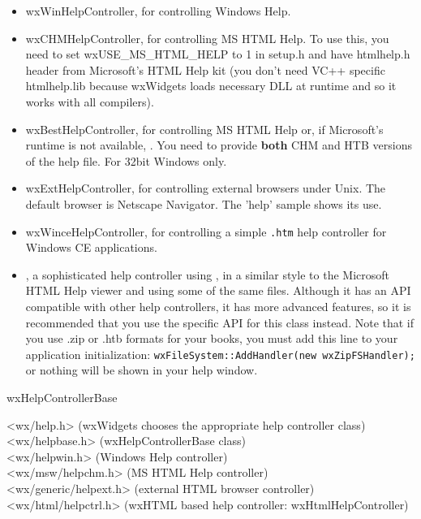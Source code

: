 \begin{itemize}\itemsep=0pt
\item wxWinHelpController, for controlling Windows Help.
\item wxCHMHelpController, for controlling MS HTML Help. To use this, you need to set wxUSE\_MS\_HTML\_HELP
to 1 in setup.h and have htmlhelp.h header from Microsoft's HTML Help kit (you don't need
VC++ specific htmlhelp.lib because wxWidgets loads necessary DLL at runtime and so it
works with all compilers).
\item wxBestHelpController, for controlling MS HTML Help or, if Microsoft's runtime is
not available, . You need to provide
{\bf both} CHM and HTB versions of the help file. For 32bit Windows only.
\item wxExtHelpController, for controlling external browsers under Unix.
The default browser is Netscape Navigator. The 'help' sample shows its use.
\item wxWinceHelpController, for controlling a simple {\tt .htm} help controller for Windows CE applications.
\item {}, a sophisticated help controller using , in
a similar style to the Microsoft HTML Help viewer and using some of the same files.
Although it has an API compatible with other help controllers, it has more advanced features, so it is
recommended that you use the specific API for this class instead. Note that if you
use .zip or .htb formats for your books, you
must add this line to your application initialization: {\tt wxFileSystem::AddHandler(new wxZipFSHandler);}
or nothing will be shown in your help window.
\end{itemize}


wxHelpControllerBase\\


<wx/help.h> (wxWidgets chooses the appropriate help controller class)\\
<wx/helpbase.h> (wxHelpControllerBase class)\\
<wx/helpwin.h> (Windows Help controller)\\
<wx/msw/helpchm.h> (MS HTML Help controller)\\
<wx/generic/helpext.h> (external HTML browser controller)\\
<wx/html/helpctrl.h> (wxHTML based help controller: wxHtmlHelpController)

